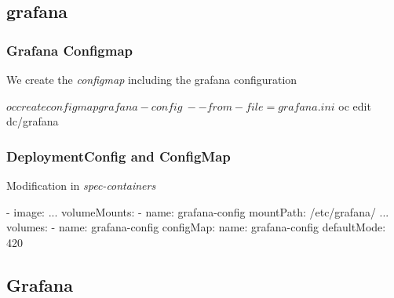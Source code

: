 \subsection{grafana}

\begin{frame}[fragile]
  \frametitle{Grafana Configmap}
  We create the \emph{configmap} including the grafana configuration \\
  \begin{bashcode}
    $ oc create configmap grafana-config \
    --from-file=grafana.ini
    $ oc edit dc/grafana
  \end{bashcode}
\end{frame}

\begin{frame}[fragile]
  \frametitle{DeploymentConfig and ConfigMap}
  Modification in \emph{spec-containers}
  \begin{yamlcode}
    - image:
      ...
      volumeMounts:
      - name: grafana-config
        mountPath: /etc/grafana/
      ...
    volumes:
    - name: grafana-config
      configMap:
        name: grafana-config
        defaultMode: 420
  \end{yamlcode}
\end{frame}

\subsection{Grafana}